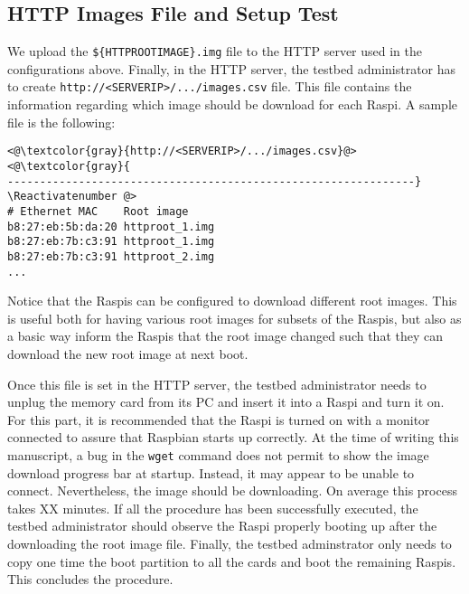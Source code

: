 \subsection{HTTP Images File and Setup Test}

We upload the \texttt{\$\{HTTPROOTIMAGE\}.img} file to the \ac{HTTP}
server used in the configurations above. Finally, in the \ac{HTTP} server,
the testbed administrator has to create
\texttt{http://<SERVERIP>/.../images.csv} file. This file contains the
information regarding which image should be download for each \ac{Raspi}. A
sample file is the following:

\Suppressnumber\begin{lstlisting}[]
<@\textcolor{gray}{http://<SERVERIP>/.../images.csv}@>
<@\textcolor{gray}{
---------------------------------------------------------------}
\Reactivatenumber @>
# Ethernet MAC    Root image
b8:27:eb:5b:da:20 httproot_1.img
b8:27:eb:7b:c3:91 httproot_1.img
b8:27:eb:7b:c3:91 httproot_2.img
...
\end{lstlisting}
\FloatBarrier
\vspace{-5mm}

Notice that the \ac{Raspi}s can be configured to download different
root images. This is useful both for having various root images for subsets
of the \ac{Raspi}s, but also as a basic way inform the \ac{Raspi}s that
the root image changed such that they can download the new root image at
next boot.

Once this file is set in the \ac{HTTP} server, the testbed
administrator needs to unplug the memory card from its \ac{PC} and insert
it into a \ac{Raspi} and turn it on. For this part, it is recommended that the
\ac{Raspi} is turned on with a monitor connected to assure that Raspbian
starts up correctly. At the time of writing this manuscript, a bug in
the \texttt{wget} command does not permit to show the image download progress
bar at startup. Instead, it may appear to be unable to connect.
Nevertheless, the image should be downloading. On average this process takes
XX minutes. If all the procedure has been successfully executed,
the testbed administrator should observe the \ac{Raspi} properly booting up
after the downloading the root image file. Finally, the testbed adminstrator
only needs to copy one time the boot partition to all the cards and
boot the remaining \ac{Raspi}s. This concludes the procedure.



